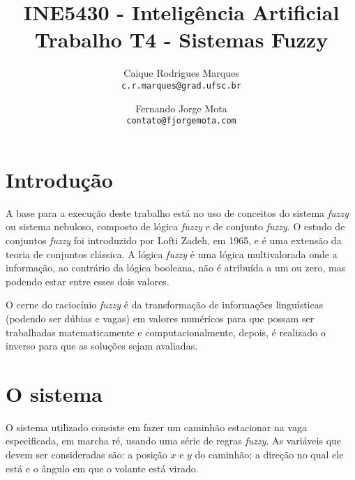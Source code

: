 \documentclass{article}
\title{\textbf{INE5430 - Inteligência Artificial \\
        \large Trabalho T4 - Sistemas Fuzzy}}
\author{
    Caique Rodrigues Marques \\
    {\texttt{c.r.marques@grad.ufsc.br}}
    \and
    Fernando Jorge Mota \\
    {\texttt{contato@fjorgemota.com}}
    \vspace{-5mm}
}
\date{}
\begin{document}
    \maketitle
    
    \section*{Introdução}
        A base para a execução deste trabalho está no uso de conceitos do
        sistema \textit{fuzzy} ou sistema nebuloso, composto de lógica
        \textit{fuzzy} e de conjunto \textit{fuzzy}. O estudo de conjuntos
        \textit{fuzzy} foi introduzido por Lofti Zadeh, em 1965, e é uma
        extensão da teoria de conjuntos clássica. A lógica \textit{fuzzy} é uma
        lógica multivalorada onde a informação, ao contrário da lógica
        booleana, não é atribuída a um ou zero, mas podendo estar entre esses
        dois valores.
        
        O cerne do raciocínio \textit{fuzzy} é da transformação de informações
        linguísticas (podendo ser dúbias e vagas) em valores numéricos para que
        possam ser trabalhadas matematicamente e computacionalmente, depois, é
        realizado o inverso para que as soluções sejam avaliadas.
    
    \section*{O sistema}
        O sistema utilizado consiste em fazer um caminhão estacionar na vaga
        especificada, em marcha ré, usando uma série de regras \textit{fuzzy}.
        As variáveis que devem ser consideradas são: a posição $x$ e $y$ do
        caminhão; a direção no qual ele está e o ângulo em que o volante está
        virado.
        
\end{document}
